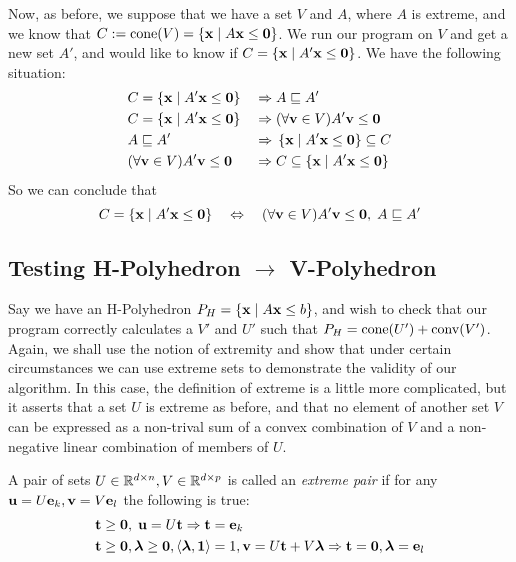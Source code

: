 Now, as before, we suppose that we have a set $V$ and $A$, where $A$ is extreme, and we know that $C := \operatorname{cone}(V) = \left\{\mathbf{x}\;|\; A\mathbf{x}\leq\mathbf{0}\right\}$.  We run our program on $V$ and get a new set $A'$, and would like to know if $C = \left\{\mathbf{x}\;|\; A'\mathbf{x}\leq\mathbf{0}\right\}$.  We have the following situation:
\begin{alignat*}{2}
  &C = \left\{\mathbf{x}\;|\; A'\mathbf{x}\leq\mathbf{0}\right\}    \;&\Rightarrow&\; A \sqsubseteq A' \\
  &C = \left\{\mathbf{x}\;|\; A'\mathbf{x}\leq\mathbf{0}\right\}    \;&\Rightarrow&\; (\forall \mathbf{v}\in V) A'\mathbf{v} \leq \mathbf{0} \\
  &A \sqsubseteq A' \;&\Rightarrow&\; \left\{\mathbf{x}\;|\; A'\mathbf{x}\leq\mathbf{0}\right\} \subseteq C \\
  &(\forall \mathbf{v}\in V) A'\mathbf{v} \leq \mathbf{0}  \;&\Rightarrow&\; C \subseteq \left\{\mathbf{x}\;|\; A'\mathbf{x}\leq\mathbf{0}\right\} 
\end{alignat*}
So we can conclude that
\[ C = \left\{\mathbf{x}\;|\; A'\mathbf{x}\leq\mathbf{0}\right\} \quad\Leftrightarrow\quad 
   (\forall \mathbf{v}\in V)A'\mathbf{v}\leq\mathbf{0},\; A \sqsubseteq A' \]

\subsection{Testing H-Polyhedron $\to$ V-Polyhedron}

Say we have an H-Polyhedron $P_H = \left\{\mathbf{x}\;|\; A\mathbf{x}\leq b\right\}$, and wish to check that our program correctly calculates a $V'$ and $U'$ such that $P_H = \operatorname{cone}(U') + \operatorname{conv}(V')$.  Again, we shall use the notion of extremity and show that under certain circumstances we can use extreme sets to demonstrate the validity of our algorithm.  In this case, the definition of extreme is a little more complicated, but it asserts that a set $U$ is extreme as before, and that no element of another set $V$ can be expressed as a non-trival sum of a convex combination of $V$ and a non-negative linear combination of members of $U$.

\begin{Def}{ A pair of sets $U\in\mathbb{R}^{d\times n}, V\in\mathbb{R}^{d\times p}$ is called an \textit{extreme pair} if for any $\mathbf{u} = U\mathbf{e}_k, \mathbf{v} = V\mathbf{e}_l$ the following is true:
\begin{alignat*}{1}
   &\mathbf{t} \geq \mathbf{0},\; \mathbf{u} = U\mathbf{t} \Rightarrow \mathbf{t} = \mathbf{e}_k \\
   &\mathbf{t} \geq \mathbf{0}, \bm{\lambda} \geq \mathbf{0}, \left\langle \bm{\lambda}, \mathbf{1} \right\rangle = 1, \mathbf{v} = U\mathbf{t} + V\bm{\lambda} 
                \Rightarrow \mathbf{t} = \mathbf{0}, \bm{\lambda} = \mathbf{e}_l
\end{alignat*}
}\end{Def}

